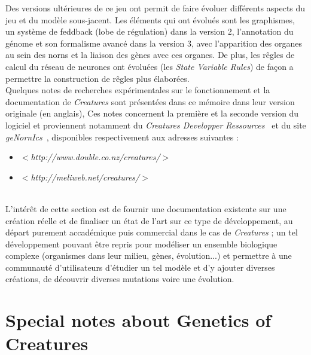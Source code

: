 \documentclass[11pt,twoside,a4paper]{article}
\begin{document}
Des versions ult{\'e}rieures de ce jeu ont permit de faire {\'e}voluer diff{\'e}rents aspects du jeu et du mod{\`e}le sous-jacent. Les {\'e}l{\'e}ments qui ont {\'e}volu{\'e}s sont les graphismes, un syst{\`e}me de feddback (lobe de r{\'e}gulation) dans la version 2, l'annotation du g{\'e}nome et son formalisme avanc{\'e} dans la version 3, avec l'apparition des organes au sein des norns et la liaison des g{\`e}nes avec ces organes. De plus, les r{\^e}gles de calcul du r{\'e}seau de neurones ont {\'e}volu{\'e}es (les \emph{State Variable Rules}) de fa\c{c}on a permettre la construction de r{\^e}gles plus {\'e}labor{\'e}es.~\\

Quelques notes de recherches exp{\'e}rimentales sur le fonctionnement et la documentation de  \textit{Creatures} sont pr{\'e}sent{\'e}es dans ce m{\'e}moire dans leur version originale (en anglais), Ces notes concernent la premi{\`e}re et la seconde version du logiciel et proviennent notamment du \emph{Creatures Developper Ressources}~\cite{CreaturesDeveloperRessources} et du site \emph{geNornIcs}~\cite{genornics}, disponibles respectivement aux adresses suivantes : 
\begin{itemize}
	\item $<$\textit{http://www.double.co.nz/creatures/}$>$~\cite{CreaturesDeveloperRessources}
	\item $<$\textit{http://meliweb.net/creatures/}$>$~\cite{genornics}
\end{itemize}~\\

L'int{\'e}r{\^e}t de cette section est de fournir une documentation existente sur une cr{\'e}ation r{\'e}elle et de finaliser un {\'e}tat de l'art sur ce type de d{\'e}veloppement, au d{\'e}part purement accad{\'e}mique puis commercial dans le cas de \emph{Creatures} ; un tel d{\'e}veloppement pouvant {\^e}tre repris pour mod{\'e}liser un ensemble biologique complexe (organismes dans leur milieu, g{\`e}nes, {\'e}volution...) et permettre {\`a} une communaut{\'e} d'utilisateurs d'{\'e}tudier un tel mod{\`e}le et d'y ajouter diverses cr{\'e}ations, de d{\'e}couvrir diverses mutations voire une {\'e}volution.~\\

\clearpage

\section{Special notes about Genetics of Creatures}
\end{document}
